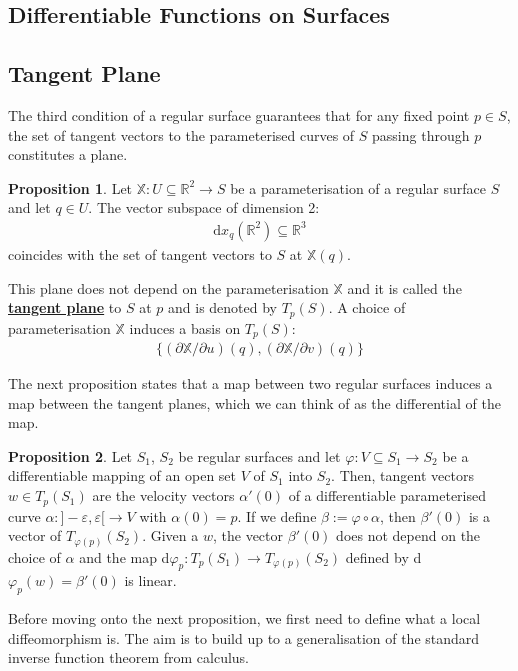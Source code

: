 \documentclass[11pt]{scrartcl}
\newcommand{\R}[0]{\mathbb{R}}
\theoremstyle{definition}
\newtheorem{prop}{Proposition}
\theoremstyle{remark}
\newcommand{\dfn}[1]{\textbf{\underline{#1}}}
\begin{document}
{\subsection{Differentiable Functions on Surfaces}

\subsection{Tangent Plane}

The third condition of a regular surface guarantees that for any fixed point $p \in S$, the set of tangent vectors to the parameterised curves of $S$ passing through $p$ constitutes a plane. 

\begin{prop}
	Let $\mathbb{X}: U \subseteq \R^2 \rightarrow S$ be a parameterisation of a regular surface $S$ and let $q \in U$. The vector subspace of dimension 2: 
	\begin{align}
		\text{d}x_q (\R^2) \subseteq \R^3 	
	\end{align}
	coincides with the set of tangent vectors to $S$ at $\mathbb{X}(q)$. 
\end{prop}
This plane does not depend on the parameterisation $\mathbb{X}$ and it is called the \dfn{tangent plane} to $S$ at $p$ and is denoted by $T_p(S)$. A choice of parameterisation $\mathbb{X}$ induces a basis on $T_p(S)$: 
\begin{align*}
	\{ (\partial \mathbb{X}/ \partial u)(q), ( \partial \mathbb{X}/ \partial v)(q) \} 
\end{align*}


The next proposition states that a map between two regular surfaces induces a map between the tangent planes, which we can think of as the differential of the map. 

\begin{prop}
	Let $S_1$, $S_2$ be regular surfaces and let $\varphi: V \subseteq S_1 \rightarrow S_2$ be a differentiable mapping of an open set $V$ of $S_1$ into $S_2$. Then, tangent vectors $w \in T_p(S_1)$ are the velocity vectors $\alpha'(0)$ of a differentiable parameterised curve $\alpha: ]-\varepsilon, \varepsilon[ \rightarrow V$ with $\alpha(0) = p$. If we define $\beta:= \varphi \circ \alpha$, then $\beta '(0)$ is a vector of $T_{\varphi(p)}(S_2)$. Given a $w$, the vector $\beta'(0)$ does not depend on the choice of $\alpha$ and the map d$\varphi_p: T_p(S_1) \rightarrow T_{\varphi(p)}(S_2)$  defined by d$\varphi_p(w) = \beta'(0)$ is linear. 
\end{prop}
Before moving onto the next proposition, we first need to define what a local diffeomorphism is. The aim is to build up to a generalisation of the standard inverse function theorem from calculus. 

}
\end{document}

